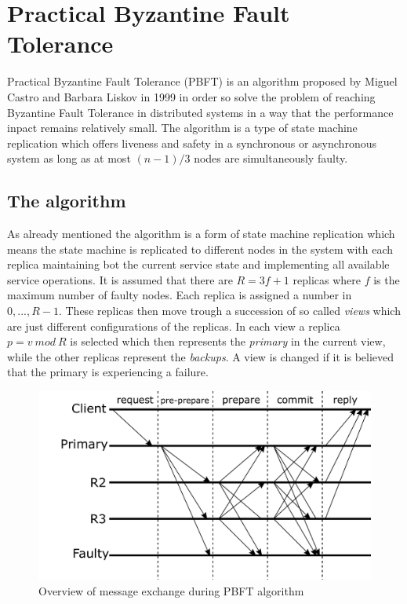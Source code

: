 \section{Practical Byzantine Fault \\
Tolerance}

Practical Byzantine Fault Tolerance (PBFT) is an algorithm proposed by Miguel Castro and Barbara Liskov in 1999 in order so solve the problem of reaching Byzantine Fault Tolerance in distributed
systems in a way that the performance inpact remains relatively small. The algorithm is a type of state machine replication which offers liveness and safety in a synchronous or
asynchronous system as long as at most $(n-1)/3$ nodes are simultaneously faulty.\cite{url:pbft}

\subsection{The algorithm}

As already mentioned the algorithm is a form of state machine replication which means the state machine is replicated to different nodes in the system with each replica maintaining bot the current
service state and implementing all available service operations. It is assumed that there are $R=3f+1$ replicas where $f$ is the maximum number of faulty nodes. Each replica is assigned a number
in ${0,...,R-1}$. These replicas then move trough a succession of so called \textit{views} which are just different configurations of the replicas. In each view a replica $p=v\ mod\ R$ is selected
which then represents the \textit{primary} in the current view, while the other replicas represent the \textit{backups}. A view is changed if it is believed that the primary is experiencing a
failure.

\begin{figure}[ht]
\centering
\includegraphics[width=1\columnwidth]{fig/PBFT.pdf}
\caption{Overview of message exchange during PBFT algorithm}
\end{figure}

